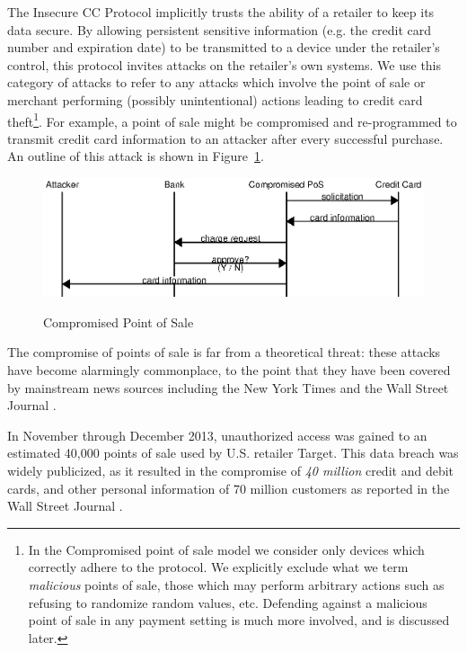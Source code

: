 The Insecure CC Protocol implicitly trusts the ability of a retailer to keep its data secure.
By allowing persistent sensitive information (e.g. the credit card number and expiration date) to be transmitted to a device under the retailer's control,
  this protocol invites attacks on the retailer's own systems.
We use this category of attacks to refer to any attacks which involve the point of sale or merchant performing (possibly unintentional) actions leading to credit card theft\footnote{
	In the Compromised point of sale model we consider only devices which correctly adhere to the protocol.
	We explicitly exclude what we term \emph{malicious} points of sale, those which may perform arbitrary actions such as refusing to randomize random values, etc.
	Defending against a malicious point of sale in any payment setting is much more involved, and is discussed later.
}.
For example, a point of sale might be compromised and re-programmed to transmit credit card information to an attacker after every successful purchase.
An outline of this attack is shown in Figure~\ref{fig:insecure-compromised}.

\begin{figure}[h!]
  \caption{Compromised Point of Sale}
  \centering
    \includegraphics{img/attack-3-comppos.eps}
  \label{fig:insecure-compromised}
\end{figure}

The compromise of points of sale is far from a theoretical threat:
these attacks have become alarmingly commonplace, to the point that they have been covered by mainstream news sources including the New York Times \cite{neimanmarcushack} and the Wall Street Journal \cite{targethack}\cite{homedepothack}.

In November through December 2013, unauthorized access was gained to an estimated 40,000 points of sale used by U.S. retailer Target.
This data breach was widely publicized, as it resulted in the compromise of \emph{40 million} credit and debit cards, and other personal information of 70 million customers as reported in the Wall Street Journal \cite{targethack}.

